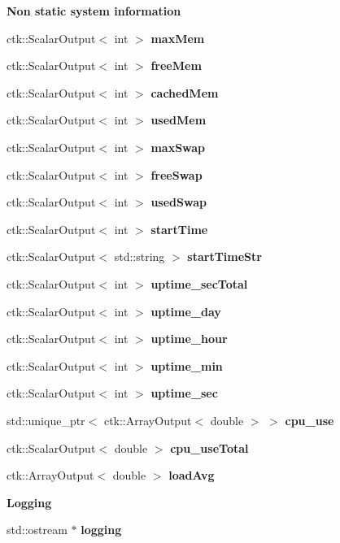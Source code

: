 \begin{Indent}{\bf Non static system information}\par
\begin{DoxyCompactItemize}
\item 
ctk\+::\+Scalar\+Output$<$ int $>$ {\bfseries max\+Mem}
\item 
ctk\+::\+Scalar\+Output$<$ int $>$ {\bfseries free\+Mem}
\item 
ctk\+::\+Scalar\+Output$<$ int $>$ {\bfseries cached\+Mem}
\item 
ctk\+::\+Scalar\+Output$<$ int $>$ {\bfseries used\+Mem}
\item 
ctk\+::\+Scalar\+Output$<$ int $>$ {\bfseries max\+Swap}
\item 
ctk\+::\+Scalar\+Output$<$ int $>$ {\bfseries free\+Swap}
\item 
ctk\+::\+Scalar\+Output$<$ int $>$ {\bfseries used\+Swap}
\item 
ctk\+::\+Scalar\+Output$<$ int $>$ {\bfseries start\+Time}
\item 
ctk\+::\+Scalar\+Output$<$ std\+::string $>$ {\bfseries start\+Time\+Str}
\item 
ctk\+::\+Scalar\+Output$<$ int $>$ {\bfseries uptime\+\_\+sec\+Total}
\item 
ctk\+::\+Scalar\+Output$<$ int $>$ {\bfseries uptime\+\_\+day}
\item 
ctk\+::\+Scalar\+Output$<$ int $>$ {\bfseries uptime\+\_\+hour}
\item 
ctk\+::\+Scalar\+Output$<$ int $>$ {\bfseries uptime\+\_\+min}
\item 
ctk\+::\+Scalar\+Output$<$ int $>$ {\bfseries uptime\+\_\+sec}
\item 
std\+::unique\+\_\+ptr$<$ ctk\+::\+Array\+Output$<$ double $>$ $>$ {\bfseries cpu\+\_\+use}\hypertarget{classSystemInfoModule_a7b3c7cf84e13a82bd34f3697f4b891b7}{}\label{classSystemInfoModule_a7b3c7cf84e13a82bd34f3697f4b891b7}

\item 
ctk\+::\+Scalar\+Output$<$ double $>$ {\bfseries cpu\+\_\+use\+Total}
\item 
ctk\+::\+Array\+Output$<$ double $>$ {\bfseries load\+Avg}
\end{DoxyCompactItemize}
\end{Indent}
\begin{Indent}{\bf Logging}\par
\begin{DoxyCompactItemize}
\item 
std\+::ostream $\ast$ {\bfseries logging}\hypertarget{classSystemInfoModule_a805d0f8de26592dfd9ee85c0a0fe1b74}{}\label{classSystemInfoModule_a805d0f8de26592dfd9ee85c0a0fe1b74}

\end{DoxyCompactItemize}
\end{Indent}


